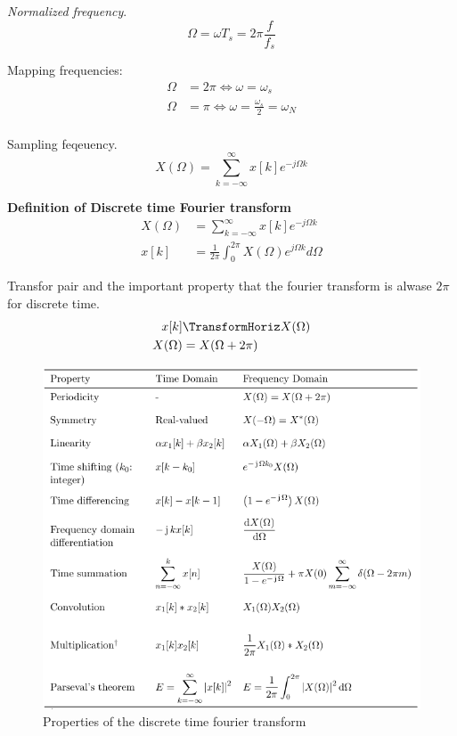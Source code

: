 \documentclass{article}
\begin{document}
\textit{Normalized frequency}.
\begin{equation*}
    \Omega = \omega T_s = 2\pi\frac{f}{f_s}
\end{equation*}

Mapping frequencies:
\begin{align*}
    \Omega &= 2\pi \Leftrightarrow \omega = \omega_s \\
    \Omega &= \pi \Leftrightarrow \omega = \frac{\omega_s}{2} = \omega_N \\
\end{align*}

Sampling feqeuency.
\begin{equation*}
    X(\Omega) = \sum_{k=-\infty}^{\infty} x[k]e^{-j\Omega k}
\end{equation*}

\newpage
\textbf{Definition of Discrete time Fourier transform}
\begin{align*}
    X(\Omega) &= \sum_{k=-\infty}^{\infty} x[k]e^{-j\Omega k} \\
    x[k] &= \frac{1}{2\pi}\int_0^{2\pi} X(\Omega)e^{j\Omega k} d\Omega
\end{align*}

Transfor pair and the important property that the fourier transform is alwase 
$2\pi$ for discrete time.
\begin{align*}
    x[k] &\TransformHoriz X(\Omega) \\
    X(\Omega) &= X(\Omega + 2\pi) \\
\end{align*}

\begin{figure}[!h]
    \centering
    \includegraphics[width=12cm]{image/properties_discrete_time_fourier_transform.png}
    \caption{Properties of the discrete time fourier transform}
    \label{fig:properties_of_the_discrete_time_fourier_transform}
\end{figure}
\end{document}
